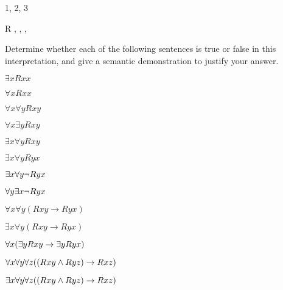 \begin{multicols}{2}
	\begin{ekey}
		\item[\text{Domain}] 1, 2, 3
		\item[R] , , ,  
	\end{ekey}
\columnbreak


\end{multicols}


\noindent Determine whether each of the following sentences is true or false in this interpretation, and give a semantic demonstration to justify your answer.
\begin{earg}
\item $\exists x Rxx$
\item $\forall x Rxx$
\item $\forall x \forall yRxy$
\item $\forall x\exists yRxy$
\item $\exists x \forall y Rxy$
\item $\exists x \forall y Ryx$
\item $\exists x \forall y \neg Ryx$
\item $\forall y \exists x\neg Ryx$
\item $\forall x \forall y(Rxy \rightarrow Ryx)$
\item $\exists x\forall y(Rxy \rightarrow Ryx)$
\item $\forall x(\exists y Rxy \rightarrow \exists y Ryx)$
\item $\forall x \forall y \forall z ((Rxy \wedge Ryz) \rightarrow Rxz)$
\item $\exists x \forall y \forall z ((Rxy \wedge Ryz) \rightarrow Rxz)$

\end{earg}



